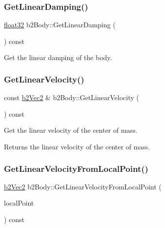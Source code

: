 \mbox{\label{classb2_body_aff6bc518ea0f07fa5bba7cb7782e86d1}} 
\subsubsection{\texorpdfstring{GetLinearDamping()}{GetLinearDamping()}}
{\footnotesize\ttfamily \mbox{\hyperlink{b2_settings_8h_aacdc525d6f7bddb3ae95d5c311bd06a1}{float32}} b2\+Body\+::\+Get\+Linear\+Damping (\begin{DoxyParamCaption}{ }\end{DoxyParamCaption}) const\hspace{0.3cm}{\ttfamily [inline]}}



Get the linear damping of the body. 

\mbox{\label{classb2_body_a8fcaf842141320701057f679dff90b89}} 
\subsubsection{\texorpdfstring{GetLinearVelocity()}{GetLinearVelocity()}}
{\footnotesize\ttfamily const \mbox{\hyperlink{structb2_vec2}{b2\+Vec2}} \& b2\+Body\+::\+Get\+Linear\+Velocity (\begin{DoxyParamCaption}{ }\end{DoxyParamCaption}) const\hspace{0.3cm}{\ttfamily [inline]}}

Get the linear velocity of the center of mass. \begin{DoxyReturn}{Returns}
the linear velocity of the center of mass. 
\end{DoxyReturn}
\mbox{\label{classb2_body_a0ac0a4ad6ac3c7804652d9994239dcbd}} 
\subsubsection{\texorpdfstring{GetLinearVelocityFromLocalPoint()}{GetLinearVelocityFromLocalPoint()}}
{\footnotesize\ttfamily \mbox{\hyperlink{structb2_vec2}{b2\+Vec2}} b2\+Body\+::\+Get\+Linear\+Velocity\+From\+Local\+Point (\begin{DoxyParamCaption}\item[{const \mbox{\hyperlink{structb2_vec2}{b2\+Vec2}} \&}]{local\+Point }\end{DoxyParamCaption}) const\hspace{0.3cm}{\ttfamily [inline]}}

